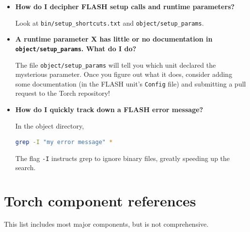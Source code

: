 \documentclass[10pt]{article}
\begin{document}
\begin{itemize}

    \item \textbf{How do I decipher FLASH setup calls and runtime parameters?}

        Look at \texttt{bin/setup\_shortcuts.txt} and \texttt{object/setup\_params}.

    \item \textbf{A runtime parameter X has little or no documentation in
        \texttt{object/setup\_params}.  What do I do?}

        The file \texttt{object/setup\_params} will tell you which unit
        declared the mysterious parameter.  Once you figure out what it does,
        consider adding some documentation (in the FLASH unit's \texttt{Config}
        file) and submitting a pull request to the Torch repository!

    \item \textbf{How do I quickly track down a FLASH error message?}

        In the object directory,
\begin{lstlisting}[language=bash]
grep -I "my error message" *
\end{lstlisting}
        The flag \texttt{-I} instructs grep to ignore binary files, greatly
        speeding up the search.

\end{itemize}

\appendix
\section{Torch component references}
\label{sec:components}

This list includes most major components, but is not comprehensive.
\end{document}
